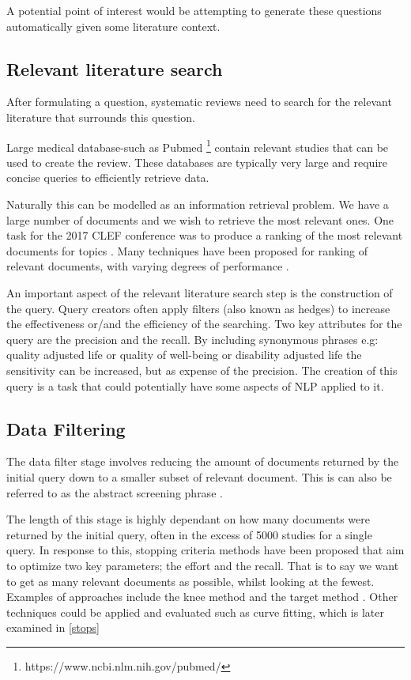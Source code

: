 A potential point of interest would be attempting to generate these questions automatically given some literature context.

\subsection{Relevant literature search}

After formulating a question, systematic reviews need to search for the relevant literature that surrounds this question.

Large medical database-such as Pubmed \footnote{https://www.ncbi.nlm.nih.gov/pubmed/} contain relevant studies that can be used to create the review. These databases are typically very large and require concise queries to efficiently retrieve data.

Naturally this can be modelled as an information retrieval problem. We have a large number of documents and we wish to retrieve the most relevant ones. One task for the 2017 CLEF conference was to produce a ranking of the most relevant documents for topics \cite{Kanoulas12017}. Many techniques have been proposed for ranking of relevant documents, with varying degrees of performance \cite{Alharbi2017} \cite{Eunkyung2017}.

An important aspect of the relevant literature search step is the construction of the query. Query creators often apply filters (also known as hedges) to increase the effectiveness or/and the efficiency of the searching. Two key attributes for the query are the precision and the recall. By including synonymous phrases e.g: quality adjusted life or quality of well-being or disability adjusted life the sensitivity can be increased, but as expense of the precision. The creation of this query is a task that could potentially have some aspects of NLP applied to it.


\subsection{Data Filtering}

The data filter stage involves reducing the amount of documents returned by the initial query down to a smaller subset of relevant document. This is can also be referred to as the abstract screening phrase \cite{Kanoulas12017}.

The length of this stage is highly dependant on how many documents were returned by the initial query, often in the excess of 5000 studies for a single query. In response to this, stopping criteria methods have been proposed that aim to optimize two key parameters; the effort and the recall. That is to say we want to get as many relevant documents as possible, whilst looking at the fewest. Examples of approaches include the knee method \cite{Satopa11} and the target method \cite{Cormack2016}. Other techniques could be applied and evaluated such as curve fitting, which is later examined in \ref{stops}

